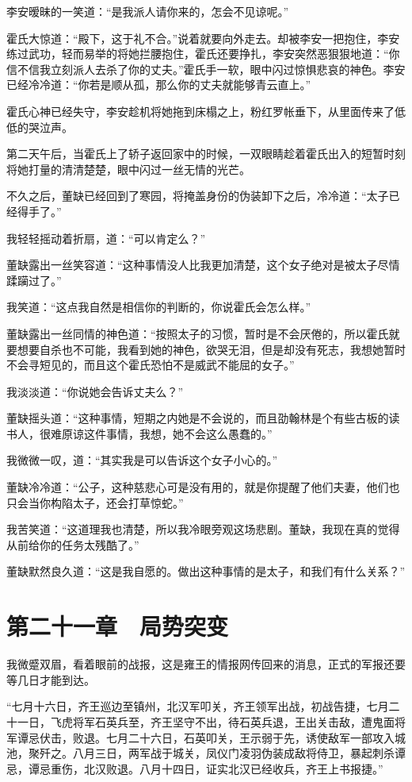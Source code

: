李安暧昧的一笑道：“是我派人请你来的，怎会不见谅呢。”

霍氏大惊道：“殿下，这于礼不合。”说着就要向外走去。却被李安一把抱住，李安练过武功，轻而易举的将她拦腰抱住，霍氏还要挣扎，李安突然恶狠狠地道：“你信不信我立刻派人去杀了你的丈夫。”霍氏手一软，眼中闪过惊惧悲哀的神色。李安已经冷冷道：“你若是顺从孤，那么你的丈夫就能够青云直上。”

霍氏心神已经失守，李安趁机将她拖到床榻之上，粉红罗帐垂下，从里面传来了低低的哭泣声。

第二天午后，当霍氏上了轿子返回家中的时候，一双眼睛趁着霍氏出入的短暂时刻将她打量的清清楚楚，眼中闪过一丝无情的光芒。

不久之后，董缺已经回到了寒园，将掩盖身份的伪装卸下之后，冷冷道：“太子已经得手了。”

我轻轻摇动着折扇，道：“可以肯定么？”

董缺露出一丝笑容道：“这种事情没人比我更加清楚，这个女子绝对是被太子尽情蹂躏过了。”

我笑道：“这点我自然是相信你的判断的，你说霍氏会怎么样。”

董缺露出一丝同情的神色道：“按照太子的习惯，暂时是不会厌倦的，所以霍氏就要想要自杀也不可能，我看到她的神色，欲哭无泪，但是却没有死志，我想她暂时不会寻短见的，而且这个霍氏恐怕不是威武不能屈的女子。”

我淡淡道：“你说她会告诉丈夫么？”

董缺摇头道：“这种事情，短期之内她是不会说的，而且劭翰林是个有些古板的读书人，很难原谅这件事情，我想，她不会这么愚蠢的。”

我微微一叹，道：“其实我是可以告诉这个女子小心的。”

董缺冷冷道：“公子，这种慈悲心可是没有用的，就是你提醒了他们夫妻，他们也只会当你构陷太子，还会打草惊蛇。”

我苦笑道：“这道理我也清楚，所以我冷眼旁观这场悲剧。董缺，我现在真的觉得从前给你的任务太残酷了。”

董缺默然良久道：“这是我自愿的。做出这种事情的是太子，和我们有什么关系？”

\chapter{第二十一章　局势突变}

我微蹙双眉，看着眼前的战报，这是雍王的情报网传回来的消息，正式的军报还要等几日才能到达。

“七月十六日，齐王巡边至镇州，北汉军叩关，齐王领军出战，初战告捷，七月二十一日，飞虎将军石英兵至，齐王坚守不出，待石英兵退，王出关击敌，遭鬼面将军谭忌伏击，败退。七月二十六日，石英叩关，王示弱于先，诱使敌军一部攻入城池，聚歼之。八月三日，两军战于城关，凤仪门凌羽伪装成敌将侍卫，暴起刺杀谭忌，谭忌重伤，北汉败退。八月十四日，证实北汉已经收兵，齐王上书报捷。”

